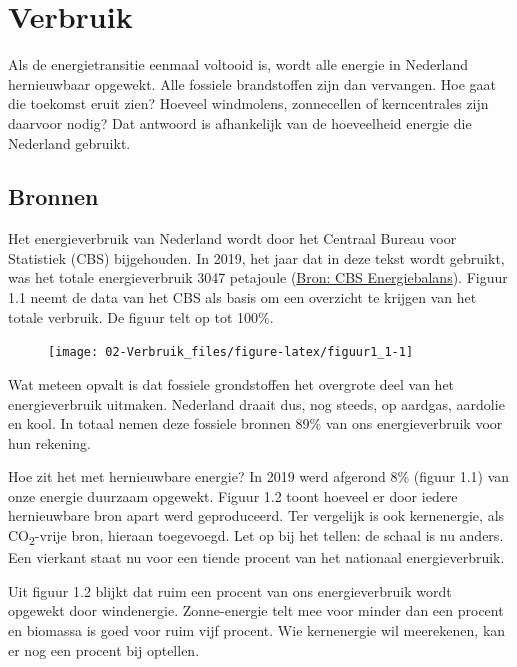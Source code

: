 \documentclass[
  11pt,
  a4paper,
]{book}
\begin{document}
\hypertarget{verbruik}{%
\chapter{Verbruik}\label{verbruik}}

\noindent Als de energietransitie eenmaal voltooid is, wordt alle energie in Nederland hernieuwbaar opgewekt. Alle fossiele brandstoffen zijn dan vervangen. Hoe gaat die toekomst eruit zien? Hoeveel windmolens, zonnecellen of kerncentrales zijn daarvoor nodig? Dat antwoord is afhankelijk van de hoeveelheid energie die Nederland gebruikt.

\hypertarget{bronnen}{%
\section{Bronnen}\label{bronnen}}

Het energieverbruik van Nederland wordt door het Centraal Bureau voor Statistiek (CBS) bijgehouden. In 2019, het jaar dat in deze tekst wordt gebruikt, was het totale energieverbruik 3047 petajoule (\href{https://opendata.cbs.nl/statline/\#/CBS/nl/dataset/83140NED/table?dl=38AA0}{Bron: CBS Energiebalans}). Figuur 1.1 neemt de data van het CBS als basis om een overzicht te krijgen van het totale verbruik. De figuur telt op tot 100\%.

\begin{figure}[!b]

{\centering \texttt{[image: 02-Verbruik\_files/figure-latex/figuur1\_1-1]} 

}

\end{figure}

Wat meteen opvalt is dat fossiele grondstoffen het overgrote deel van het energieverbruik uitmaken. Nederland draait dus, nog steeds, op aardgas, aardolie en kool. In totaal nemen deze fossiele bronnen 89\% van ons energieverbruik voor hun rekening.

Hoe zit het met hernieuwbare energie? In 2019 werd afgerond 8\% (figuur 1.1) van onze energie duurzaam opgewekt. Figuur 1.2 toont hoeveel er door iedere hernieuwbare bron apart werd geproduceerd. Ter vergelijk is ook kernenergie, als CO\textsubscript{2}-vrije bron, hieraan toegevoegd. Let op bij het tellen: de schaal is nu anders. Een vierkant staat nu voor een tiende procent van het nationaal energieverbruik.

Uit figuur 1.2 blijkt dat ruim een procent van ons energieverbruik wordt opgewekt door windenergie. Zonne-energie telt mee voor minder dan een procent en biomassa is goed voor ruim vijf procent. Wie kernenergie wil meerekenen, kan er nog een procent bij optellen.
\end{document}
